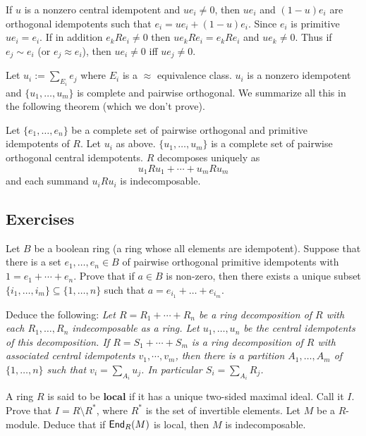 If $u$ is a nonzero central idempotent and $ue_i \neq 0$, then $ue_i$ and $(1-u)e_i$ are orthogonal idempotents such that $e_i=ue_i+(1-u)e_i$. 
Since $e_i$ is primitive $ue_i=e_i$. 
If in addition $e_k R e_i \neq 0$ then $ue_k R e_i=e_k R e_i$ and $ue_k \neq 0$. 
Thus if $e_j \sim e_i$ (or $e_j \approx e_i$), then $ue_i \neq 0$ iff $ue_j \neq 0$. 

Let $u_i :=\sum_{E_i} e_j$ where $E_i$ is a $\approx$ equivalence class. $u_i$ is a nonzero idempotent and $\{u_1, \ldots, u_m\}$ is complete and pairwise orthogonal. 
We summarize all this in the following theorem (which we don't prove). 

\begin{thm}
Let $\{e_1, \ldots, e_n\}$ be a complete set of pairwise orthogonal and primitive idempotents of $R$.
Let $u_i$ as above. 
$\{u_1, \ldots, u_m\}$ is a complete set of pairwise orthogonal central idempotents. 
$R$ decomposes uniquely as 
$$u_1 R u_1 + \cdots + u_m R u_m$$
and each summand $u_iRu_i$ is indecomposable. 

\end{thm}

\subsection*{Exercises}
\begin{ex}
\label{boolean}
Let $B$ be a boolean ring (a ring whose all elements are idempotent).
Suppose that there is a set $e_1, \ldots , e_n \in B$ of pairwise orthogonal primitive idempotents with $1= e_1 + \cdots +e_n$. 
Prove that if $a \in B$ is non-zero, then there exists a unique subset $\{i_1,\ldots,i_m\} \subseteq \{1,\ldots,n\}$ such that $a= e_{i_1} +\ldots+e_{i_m}$.

Deduce the following: 
\textit{Let $R = R_1 + \cdots +R_n$ be a ring decomposition of $R$ with each $R_1,\ldots ,R_n$ indecomposable as a ring.
Let $u_1, \ldots, u_n$ be the central idempotents of this decomposition. 
If $R = S_1 +\cdots + S_m$ is a ring decomposition of $R$ with associated central idempotents $v_1 ,\cdots, v_m$, then there is a partition $A_1,\ldots, A_m$ of $\{1,\ldots,n\}$ such that $v_i = \sum_{A_i} u_j$. 
In particular $S_i = \sum_{A_i} R_j$.}
\end{ex}

\begin{ex}
A ring $R$ is said to be $\textbf{local}$ if it has a unique two-sided maximal ideal. 
Call it $I$. 
Prove that $I=R\setminus R^{\ast}$, where $R^{\ast}$ is the set of invertible elements. 
Let $M$ be a $R$-module. 
Deduce that if $\operatorname{\sf{End}}_R(M)$ is local, then $M$ is indecomposable.
\end{ex}
